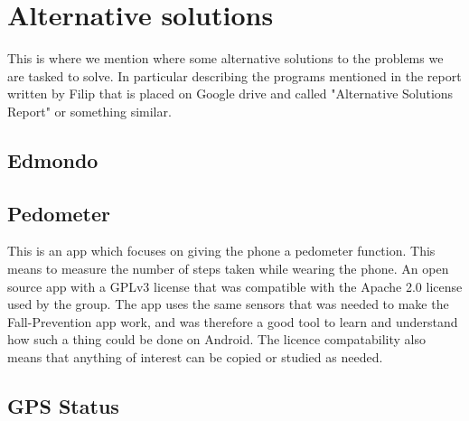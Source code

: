 \chapter{Alternative solutions}
This is where we mention where some alternative solutions to the problems we are tasked to solve. In particular describing the programs mentioned in the report written by Filip that is placed on Google drive and called "Alternative Solutions Report" or something similar.

\section{Edmondo}

\section{Pedometer}
This is an app which focuses on giving the phone a pedometer function. This means to measure the number of steps taken while wearing the phone.
An open source app with a GPLv3 license that was compatible with the Apache 2.0 license used by the group. The app uses the same sensors that was needed to make the Fall-Prevention app work, and was therefore a good tool to learn and understand how such a thing could be done on Android. The licence compatability also means that anything of interest can be copied or studied as needed.


\section{GPS Status}